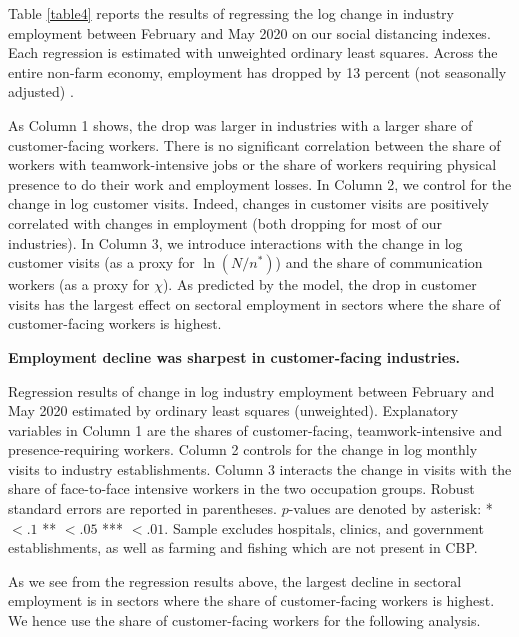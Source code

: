 Table \ref{table4} reports the results of regressing the log change in industry employment between February and May 2020 on our social distancing indexes. Each regression is estimated with unweighted ordinary least squares. Across the entire non-farm economy, employment has dropped by 13 percent (not seasonally adjusted) \cite{CES}. 

As Column 1 shows, the drop was larger in industries with a larger share of customer-facing workers. There is no significant correlation between the share of workers with teamwork-intensive jobs or the share of workers requiring physical presence to do their work and employment losses. In Column 2, we control for the change in log customer visits. Indeed, changes in customer visits are positively correlated with changes in employment (both dropping for most of our industries).  In Column 3, we introduce interactions with the change in log customer visits (as a proxy for $\ln (N/n^*)$) and the share of communication workers (as a proxy for $\chi$). As predicted by the model, the drop in customer visits has the largest effect on sectoral employment in sectors where the share of customer-facing workers is highest.
 
\begin{table}[!ht]
\caption{
{\bf Employment decline was sharpest in customer-facing industries.}}

\begin{flushleft} Regression results of change in log industry employment between February and May 2020 estimated by ordinary least squares (unweighted). Explanatory variables in Column 1 are the shares of customer-facing, teamwork-intensive and presence-requiring workers. Column 2 controls for the change in log monthly visits to industry establishments. Column 3 interacts the change in visits with the share of face-to-face intensive  workers in the two occupation groups. Robust standard errors are reported in parentheses. $p$-values are denoted by asterisk: * $<.1$ ** $<.05$ *** $<.01$.
Sample excludes hospitals, clinics, and government establishments, as well as farming and fishing which are not present in CBP.
\end{flushleft}
\label{table4}
\end{table}


As we see from the regression results above, the largest decline in sectoral employment is in sectors where the share of customer-facing workers is highest. We hence use the share of customer-facing workers for the following analysis. 


